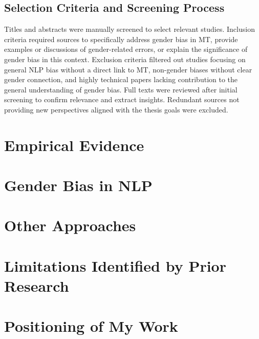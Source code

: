 \subsection{Selection Criteria and Screening Process}
Titles and abstracts were manually screened to select relevant studies. Inclusion criteria required sources to specifically address gender bias in MT, provide examples or discussions of gender-related errors, or explain the significance of gender bias in this context. Exclusion criteria filtered out studies focusing on general NLP bias without a direct link to MT, non-gender biases without clear gender connection, and highly technical papers lacking contribution to the general understanding of gender bias. Full texts were reviewed after initial screening to confirm relevance and extract insights. Redundant sources not providing new perspectives aligned with the thesis goals were excluded.

\section{Empirical Evidence}


\section{Gender Bias in NLP}

\section{Other Approaches}
    
\section{Limitations Identified by Prior Research}    


\section{Positioning of My Work}    
    
